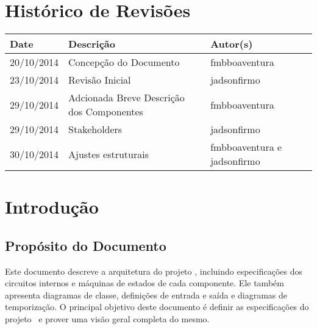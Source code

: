 \documentclass{report}
\begin{document}

\capa
\newpage
\newpage

\chapter*{Histórico de Revisões}
  \vspace*{1cm}
  \begin{table}[ht]
    \centering
    \begin{tabular}[pos]{|m{2cm} | m{8cm} | m{4cm}|} 
      \hline
      \cellcolor[gray]{0.9}
      \textbf{Date} & \cellcolor[gray]{0.9}\textbf{Descrição} & \cellcolor[gray]{0.9}\textbf{Autor(s)}\\
      \hline 20/10/2014 &  Concepção do Documento & fmbboaventura \\ \hline
      		 23/10/2014 &  Revisão Inicial & jadsonfirmo \\ \hline
      		 29/10/2014 &  Adcionada Breve Descrição dos Componentes & fmbboaventura \\ \hline       
      		 29/10/2014 & Stakeholders & jadsonfirmo \\ \hline
      		 30/10/2014 & Ajustes estruturais & fmbboaventura e jadsonfirmo \\ \hline
    \end{tabular}
  \end{table}

\tableofcontents

\chapter{Introdução}
  
  \section{Propósito do Documento}
  Este documento descreve a arquitetura do projeto \ipPROCESSProject, incluindo especificações dos circuitos internos e máquinas de estados de cada componente. Ele também apresenta diagramas de classe, definições de entrada e saída e diagramas de temporização. O principal objetivo deste documento é definir as especificações do projeto \ipPROCESSProject\ e prover uma visão geral completa do mesmo.
  
\end{document}
